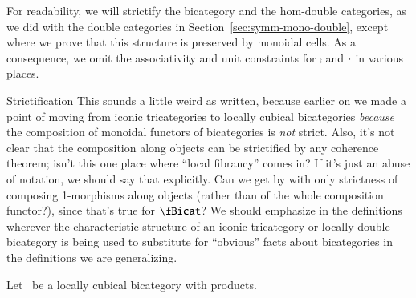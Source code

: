 For readability, we will strictify the bicategory and the hom-double categories, as we did with the double categories in Section~\ref{sec:symm-mono-double}, except where we prove that this structure is preserved by monoidal cells. As a consequence, we omit the associativity and unit constraints for $\comp$ and $\cdot$ in various places.
\begin{anfxnote}[author=MS]{Strictification}
  This sounds a little weird as written, because earlier on we made a point of moving from iconic tricategories to locally cubical bicategories \emph{because} the composition of monoidal functors of bicategories is \emph{not} strict.
  Also, it's not clear that the composition along objects can be strictified by any coherence theorem; isn't this one place where ``local fibrancy'' comes in?
  If it's just an abuse of notation, we should say that explicitly.
  Can we get by with only strictness of composing 1-morphisms along objects (rather than of the whole composition functor?), since that's true for $\fBicat$?
  We should emphasize in the definitions wherever the characteristic structure of an iconic tricategory or locally double bicategory is being used to substitute for ``obvious'' facts about bicategories in the definitions we are generalizing.
\end{anfxnote}

Let \fB\ be a locally cubical bicategory with products.


